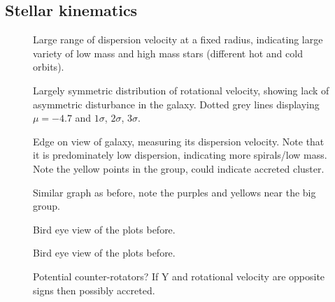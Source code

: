 \documentclass{article}
\begin{document}
\subsection*{Stellar kinematics}

\begin{figure} [H]
    \centering
    \scalebox{0.75}{}
    \caption{Large range of dispersion velocity at a fixed
    radius, indicating large variety of low mass and high 
    mass stars (different hot and cold orbits).}
\end{figure}

\begin{figure} [H]
    \centering
    \scalebox{0.75}{}
    \caption{Largely symmetric distribution of rotational 
    velocity, showing lack of asymmetric disturbance in 
    the galaxy. Dotted grey lines displaying $\mu = -4.7$
    and $1\sigma$, $2\sigma$, $3\sigma$.}
\end{figure}

\begin{figure} [H]
    \centering
    \scalebox{0.75}{}
    \caption{Edge on view of galaxy, measuring its 
    dispersion velocity. Note that it is predominately
    low dispersion, indicating more spirals/low mass. 
    Note the yellow points in the group, could indicate
    accreted cluster.}
\end{figure}

\begin{figure} [H]
    \centering
    \scalebox{0.75}{}
    \caption{Similar graph as before, note the purples
    and yellows near the big group.}
\end{figure}

\begin{figure} [H]
    \centering
    \scalebox{0.75}{}
    \caption{Bird eye view of the plots before.}
\end{figure}

\begin{figure} [H]
    \centering
    \scalebox{0.75}{}
    \caption{Bird eye view of the plots before.}
\end{figure}

\begin{figure} [H]
    \centering
    \scalebox{0.75}{}
    \caption{Potential counter-rotators? If Y and 
    rotational velocity are opposite signs then 
    possibly accreted.}
\end{figure}
\end{document}
